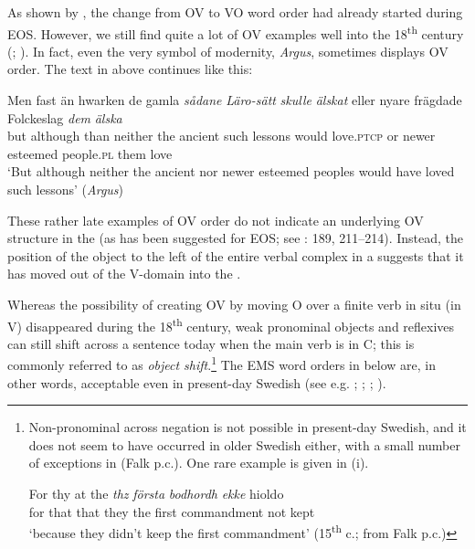 \documentclass[output=paper]{langscibook}
\begin{document}
As shown by \citet{Delsing1999}, the change from OV to VO word order had already started during EOS. However, we still find quite a lot of OV examples well into the 18\textsuperscript{th} century (\citealt{Petzell2011}; \citealt{Sangfelt2019}). In fact, even the very symbol of modernity, \textit{Argus}, sometimes displays OV order. The text in  above continues like this:


\ea
\gll Men  fast      än   hwarken de gamla \textit{sådane} \textit{Läro-sätt} \textit{skulle} \textit{älskat} eller   nyare     frägdade   Folckeslag \textit{dem} \textit{älska}\\
but     although   than   neither   the ancient  such       lessons    would  love\textsc{.ptcp} or  newer  esteemed people.\textsc{pl}  them love\\
\glt ‘But although neither the ancient nor newer esteemed peoples would have loved such lessons’ (\textit{Argus})
\z

These rather late examples of OV order do not indicate an underlying OV structure in the  (as has been suggested for EOS; see \citealt{Delsing1999}: 189, 211–214). Instead, the position of the object to the left of the entire verbal complex in a  suggests that it has moved out of the V-domain into the  \citep{Petzell2011}. 



Whereas the possibility of creating OV by moving O over a finite verb in situ (in V) disappeared during the 18\textsuperscript{th} century, weak pronominal objects and reflexives can still shift across a sentence  today when the main verb is in C; this is commonly referred to as \textit{object shift}.\footnote{Non-pronominal
     across negation is not possible in present-day Swedish, and it does not seem to have occurred in older Swedish either, with a small number of exceptions in  (Falk p.c.). One rare example is given in (i).

    \ea
    \gll  For thy at   the \textit{thz} \textit{första} \textit{bodhordh} \textit{ekke} hioldo\\
        for that that   they   the first   commandment   not   kept\\
        \glt ‘because they didn’t keep the first commandment’ (15\textsuperscript{th} c.; from Falk p.c.)
    \z
    }
The EMS word orders in  below are, in other words, acceptable even in present-day Swedish (see e.g. \citealt{Holmberg1986}; \citealt{Andreasson2008}; \citealt{Bentzen2014}; \citealt{Erteschik-ShirJosefsson2017}).
\end{document}
